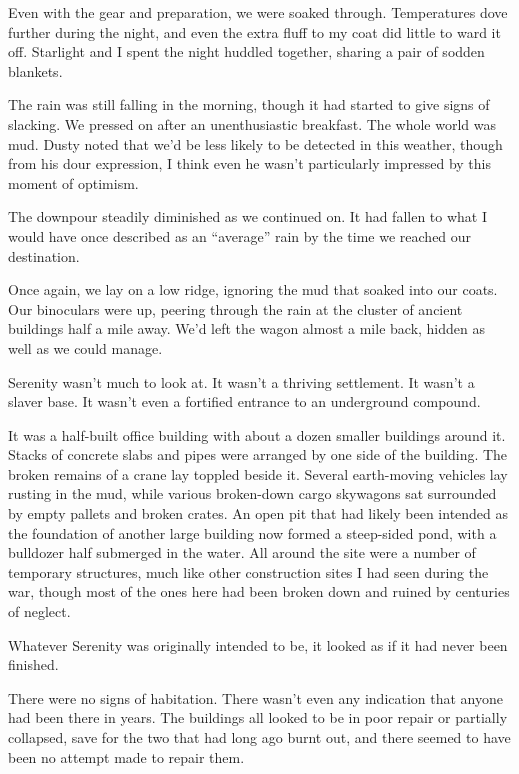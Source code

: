 Even with the gear and preparation, we were soaked through. Temperatures dove further during the night, and even the extra fluff to my coat did little to ward it off. Starlight and I spent the night huddled together, sharing a pair of sodden blankets.

The rain was still falling in the morning, though it had started to give signs of slacking. We pressed on after an unenthusiastic breakfast. The whole world was mud. Dusty noted that we’d be less likely to be detected in this weather, though from his dour expression, I think even he wasn’t particularly impressed by this moment of optimism.

The downpour steadily diminished as we continued on. It had fallen to what I would have once described as an “average” rain by the time we reached our destination.

{\br}%
Once again, we lay on a low ridge, ignoring the mud that soaked into our coats. Our binoculars were up, peering through the rain at the cluster of ancient buildings half a mile away. We’d left the wagon almost a mile back, hidden as well as we could manage.

Serenity wasn’t much to look at. It wasn’t a thriving settlement. It wasn’t a slaver base. It wasn’t even a fortified entrance to an underground compound.

It was a half-built office building with about a dozen smaller buildings around it. Stacks of concrete slabs and pipes were arranged by one side of the building. The broken remains of a crane lay toppled beside it. Several earth-moving vehicles lay rusting in the mud, while various broken-down cargo skywagons sat surrounded by empty pallets and broken crates. An open pit that had likely been intended as the foundation of another large building now formed a steep-sided pond, with a bulldozer half submerged in the water. All around the site were a number of temporary structures, much like other construction sites I had seen during the war, though most of the ones here had been broken down and ruined by centuries of neglect.

Whatever Serenity was originally intended to be, it looked as if it had never been finished.

There were no signs of habitation. There wasn’t even any indication that anyone had been there in years. The buildings all looked to be in poor repair or partially collapsed, save for the two that had long ago burnt out, and there seemed to have been no attempt made to repair them.

